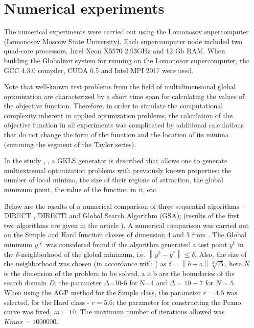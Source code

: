 \documentclass{svproc}
\begin{document}
\section{Numerical experiments}

The numerical experiments were carried out using the Lomonosov supercomputer (Lomonosov Moscow State University). Each supercomputer node included two quad-core processors, Intel Xeon X5570 2.93GHz and 12 Gb RAM. When building the Globalizer system for running on the Lomonosov supercomputer, the GCC 4.3.0 compiler, CUDA 6.5 and Intel MPI 2017 were used.

Note that well-known test problems from the field of multidimensional global optimization are characterized by a short time span for calculating the values of the objective function. Therefore, in order to simulate the computational complexity inherent in applied optimization problems, the calculation of the objective function in all experiments was complicated by additional calculations that do not change the form of the function and the location of its minima (summing the segment of the Taylor series).

In the study \cite{Ref15}, \cite{Ref16}, a GKLS generator is described that allows one to generate multiextremal optimization problems with previously known properties: the number of local minima, the size of their regions of attraction, the global minimum point, the value of the function in it, etc.

Below are the results of a numerical comparison of three sequential algorithms -- DIRECT \cite{Ref15}, DIRECTl \cite{Ref17} and Global Search Algorithm (GSA); (results of the first two algorithms are given in the article \cite{Ref18}). A numerical comparison was carried out on the Simple and Hard function classes of dimension 4 and 5 from \cite{Ref18}. The Global minimum $y*$ was considered found if the algorithm generated a test point $y^k$ in the $\delta$-neighborhood of the global minimum, i.e. $\left\| {{y}^{k}}-{{y}^{*}} \right\|\le \delta $. Also, the size of the neighborhood was chosen (in accordance with \cite{Ref18}) as $\delta =\left\| b-a \right\|\sqrt[N]{\Delta }$, here $N$ is the dimension of the problem to be solved, a и b are the boundaries of the search domain $D$, the parameter  $\Delta $=10-6 for N=4 and $\Delta =10-7$ for $N=5$. When using the AGP method for the Simple class, the parameter $r=4.5$ was selected, for the Hard class - $r=5.6$; the parameter for constructing the Peano curve was fixed, $m=10$. The maximum number of iterations allowed was $Kmax = 1 000 000$. 
\end{document}
